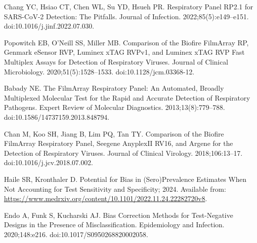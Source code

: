 \documentclass[10pt,letterpaper]{article}
\begin{document}
\begin{thebibliography}{10}
Chang YC, Hsiao CT, Chen WL, Su YD, Hsueh PR.
 Respiratory Panel {{RP2}}.1 for {{SARS-CoV-2}}
  Detection: {{The}} Pitfalls.
\newblock Journal of Infection. 2022;85(5):e149--e151.
\newblock doi:{10.1016/j.jinf.2022.07.030}.

Popowitch EB, O'Neill SS, Miller MB.
\newblock Comparison of the {{Biofire FilmArray RP}}, {{Genmark eSensor RVP}},
  {{Luminex xTAG RVPv1}}, and {{Luminex xTAG RVP Fast Multiplex Assays}} for
  {{Detection}} of {{Respiratory Viruses}}.
\newblock Journal of Clinical Microbiology. 2020;51(5):1528--1533.
\newblock doi:{10.1128/jcm.03368-12}.

Babady NE.
\newblock The {{FilmArray}} Respiratory Panel: An Automated, Broadly
  Multiplexed Molecular Test for the Rapid and Accurate Detection of
  Respiratory Pathogens.
\newblock Expert Review of Molecular Diagnostics. 2013;13(8):779--788.
\newblock doi:{10.1586/14737159.2013.848794}.

Chan M, Koo SH, Jiang B, Lim PQ, Tan TY.
\newblock Comparison of the {{Biofire FilmArray Respiratory Panel}}, {{Seegene
  AnyplexII RV16}}, and {{Argene}} for the Detection of Respiratory Viruses.
\newblock Journal of Clinical Virology. 2018;106:13--17.
\newblock doi:{10.1016/j.jcv.2018.07.002}.

Haile SR, Kronthaler D. Potential for Bias in (Sero)Prevalence Estimates When
  Not Accounting for Test Sensitivity and Specificity; 2024.
\newblock Available from:
  \url{https://www.medrxiv.org/content/10.1101/2022.11.24.22282720v8}.

Endo A, Funk S, Kucharski AJ.
\newblock Bias Correction Methods for Test-Negative Designs in the Presence of
  Misclassification.
\newblock Epidemiology and Infection. 2020;148:e216.
\newblock doi:{10.1017/S0950268820002058}.

\end{thebibliography}
\end{document}
